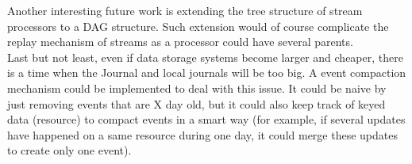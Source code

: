 Another interesting future work is extending the tree structure of stream processors to a DAG structure. Such extension would of course complicate the replay mechanism of streams as a processor could have several parents.
\\

Last but not least, even if data storage systems become larger and cheaper, there is a time when the Journal and local journals will be too big. A event compaction mechanism could be implemented to deal with this issue. It could be naive by just removing events that are X day old, but it could also keep track of keyed data (resource) to compact events in a smart way (for example, if several updates have happened on a same resource during one day, it could merge these updates to create only one event).



